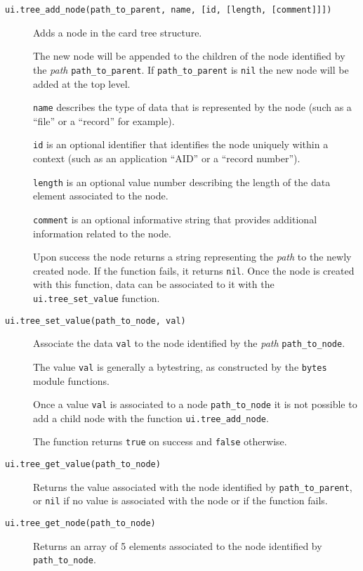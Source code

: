 \documentclass[11pt]{article}
\begin{document}
\begin{description}

\item[\texttt{ui.tree\_add\_node(path\_to\_parent, name, [id, [length, [comment]]])}]
{
  Adds a node in the card tree structure. 

  The new node will be appended to the children of the node identified by the 
  \emph{path} \texttt{path\_to\_parent}.
  If \texttt{path\_to\_parent} is \texttt{nil} the new node will be added at 
  the top level.

  \texttt{name} describes the type of data that is represented by the node 
  (such as a ``file'' or a ``record'' for example). 

  \texttt{id} is an optional identifier that identifies the node uniquely within 
  a context (such as an application ``AID'' or a ``record number'').

  \texttt{length} is an optional value number describing the length of the 
  data element associated to the node.

  \texttt{comment} is an optional informative string that provides additional 
  information related to the node.
  
  Upon success the node returns a string representing the \emph{path} to the 
  newly created node. 
  If the function fails, it returns \texttt{nil}.
  Once the node is created with this function, data can be associated to it with the \texttt{ui.tree\_set\_value} function.
}

\item[\texttt{ui.tree\_set\_value(path\_to\_node, val)}]
{
  Associate the data \texttt{val} to the node identified by the \emph{path} 
  \texttt{path\_to\_node}.

  The value \texttt{val} is generally a bytestring, 
  as constructed by the \texttt{bytes} module functions.

  Once a value \texttt{val} is associated to a node \texttt{path\_to\_node} 
  it is not possible to add a child node with the function \texttt{ui.tree\_add\_node}.
	  
  The function returns \texttt{true} on success and \texttt{false} otherwise.
}

\item[\texttt{ui.tree\_get\_value(path\_to\_node)}]
{
  Returns the value associated with the node identified by \texttt{path\_to\_parent}, 
  or \texttt{nil} if no value is associated with the node or if the function fails.
} 

\item[\texttt{ui.tree\_get\_node(path\_to\_node)}]
{
  Returns an array of 5 elements associated to the node identified by 
  \texttt{path\_to\_node}.
 
}
\end{description}
\end{document}

